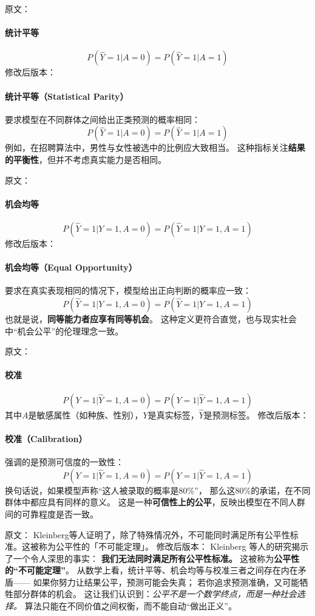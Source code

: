 原文：
\paragraph{统计平等}
$$P(\hat{Y} = 1 | A = 0) = P(\hat{Y} = 1 | A = 1)$$
修改后版本：
\paragraph{统计平等（Statistical Parity）}  
要求模型在不同群体之间给出正类预测的概率相同：  
$$P(\hat{Y}=1|A=0) = P(\hat{Y}=1|A=1)$$  
例如，在招聘算法中，男性与女性被选中的比例应大致相当。  
这种指标关注\textbf{结果的平衡性}，但并不考虑真实能力是否相同。



原文：
\paragraph{机会均等}
$$P(\hat{Y} = 1 | Y = 1, A = 0) = P(\hat{Y} = 1 | Y = 1, A = 1)$$
修改后版本：
\paragraph{机会均等（Equal Opportunity）}  
要求在真实表现相同的情况下，模型给出正向判断的概率应一致：  
$$P(\hat{Y}=1|Y=1,A=0)=P(\hat{Y}=1|Y=1,A=1)$$  
也就是说，\textbf{同等能力者应享有同等机会}。  
这种定义更符合直觉，也与现实社会中“机会公平”的伦理理念一致。



原文：
\paragraph{校准}
$$P(Y = 1 | \hat{Y} = 1, A = 0) = P(Y = 1 | \hat{Y} = 1, A = 1)$$
其中$A$是敏感属性（如种族、性别），$Y$是真实标签，$\hat{Y}$是预测标签。
修改后版本：
\paragraph{校准（Calibration）}  
强调的是预测可信度的一致性：  
$$P(Y=1|\hat{Y}=1,A=0)=P(Y=1|\hat{Y}=1,A=1)$$  
换句话说，如果模型声称“这人被录取的概率是80\%”，  
那么这80\%的承诺，在不同群体中都应具有同样的意义。  
这是一种\textbf{可信性上的公平}，反映出模型在不同人群间的可靠程度是否一致。



原文：
Kleinberg等人证明了，除了特殊情况外，不可能同时满足所有公平性标准。这被称为公平性的「不可能定理」。
修改后版本：
Kleinberg 等人的研究揭示了一个令人深思的事实：  
\textbf{我们无法同时满足所有公平性标准。}  
这被称为\textbf{公平性的“不可能定理”}。  
从数学上看，统计平等、机会均等与校准三者之间存在内在矛盾——  
如果你努力让结果公平，预测可能会失真；  
若你追求预测准确，又可能牺牲部分群体的机会。  
这让我们认识到：\textit{公平不是一个数学终点，而是一种社会选择。}  
算法只能在不同价值之间权衡，而不能自动“做出正义”。



